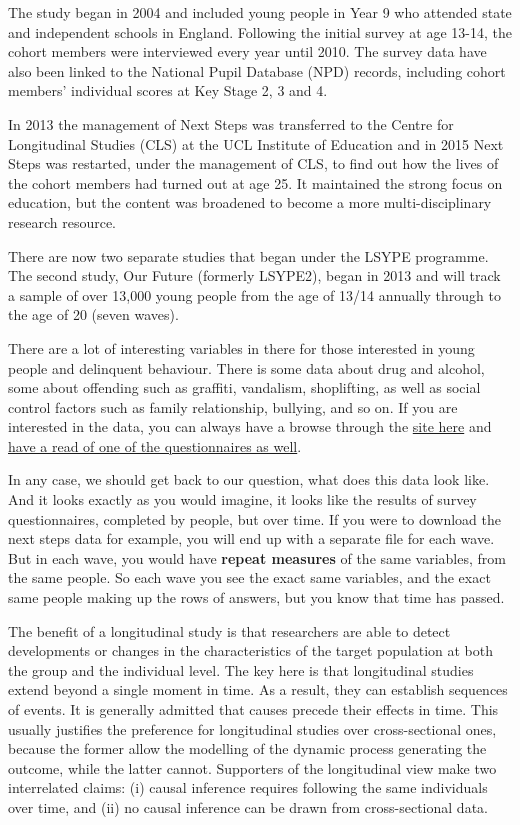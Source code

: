 \documentclass[
]{book}
\begin{document}
The study began in 2004 and included young people in Year 9 who attended state and independent schools in England. Following the initial survey at age 13-14, the cohort members were interviewed every year until 2010. The survey data have also been linked to the National Pupil Database (NPD) records, including cohort members' individual scores at Key Stage 2, 3 and 4.

In 2013 the management of Next Steps was transferred to the Centre for Longitudinal Studies (CLS) at the UCL Institute of Education and in 2015 Next Steps was restarted, under the management of CLS, to find out how the lives of the cohort members had turned out at age 25. It maintained the strong focus on education, but the content was broadened to become a more multi-disciplinary research resource.

There are now two separate studies that began under the LSYPE programme. The second study, Our Future (formerly LSYPE2), began in 2013 and will track a sample of over 13,000 young people from the age of 13/14 annually through to the age of 20 (seven waves).

There are a lot of interesting variables in there for those interested in young people and delinquent behaviour. There is some data about drug and alcohol, some about offending such as graffiti, vandalism, shoplifting, as well as social control factors such as family relationship, bullying, and so on. If you are interested in the data, you can always have a browse through the \href{https://discover.ukdataservice.ac.uk/Catalogue/?sn=5545\&type=Data\%20catalogue\&lt}{site here} and \href{http://doc.ukdataservice.ac.uk/doc/5545/mrdoc/pdf/age_25_survey_questionnaire.pdf}{have a read of one of the questionnaires as well}.

In any case, we should get back to our question, what does this data look like. And it looks exactly as you would imagine, it looks like the results of survey questionnaires, completed by people, but over time. If you were to download the next steps data for example, you will end up with a separate file for each wave. But in each wave, you would have \textbf{repeat measures} of the same variables, from the same people. So each wave you see the exact same variables, and the exact same people making up the rows of answers, but you know that time has passed.

The benefit of a longitudinal study is that researchers are able to detect developments or changes in the characteristics of the target population at both the group and the individual level. The key here is that longitudinal studies extend beyond a single moment in time. As a result, they can establish sequences of events. It is generally admitted that causes precede their effects in time. This usually justifies the preference for longitudinal studies over cross-sectional ones, because the former allow the modelling of the dynamic process generating the outcome, while the latter cannot. Supporters of the longitudinal view make two interrelated claims: (i) causal inference requires following the same individuals over time, and (ii) no causal inference can be drawn from cross-sectional data.
\end{document}
